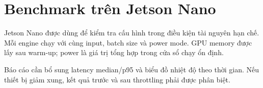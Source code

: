 \section{Benchmark trên Jetson Nano}

Jetson Nano được dùng để kiểm tra cấu hình trong điều kiện tài nguyên hạn chế.
Mỗi engine chạy với cùng input, batch size và power mode. GPU memory được lấy
sau warm-up; power là giá trị tổng hợp trong cửa sổ chạy ổn định.

\begin{landscape}
\begin{table}[H]
\centering
\caption{YOLO inference trên Jetson Nano}
\label{tab:nano-inference}
\end{table}
\end{landscape}

Báo cáo cần bổ sung latency median/p95 và biểu đồ nhiệt độ theo thời gian. Nếu
thiết bị giảm xung, kết quả trước và sau throttling phải được phân biệt.